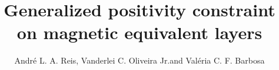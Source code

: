 \documentclass[manuscript,blind]{geophysics}
\begin{document}
\title{Generalized positivity constraint on magnetic equivalent layers}

\renewcommand{\thefootnote}{\fnsymbol{footnote}} 


\address{
\footnotemark[2] Observat\'orio Nacional, Rio de Janeiro, Brazil\\
\footnotemark[1] Corresponding author: reisandreluis@gmail.com}
\author{Andr\'e L. A. Reis\footnotemark[2] \footnotemark[1], Vanderlei C. Oliveira Jr.\footnotemark[2] and  Val\'eria C. F. Barbosa \footnotemark[2]}


\maketitle








%




\newpage



\clearpage


\end{document}

